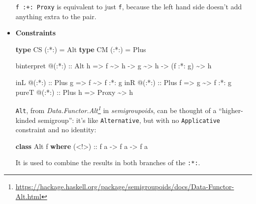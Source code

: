 \documentclass[]{article}
\newenvironment{Shaded}{}{}
\newcommand{\DataTypeTok}[1]{\textcolor[rgb]{0.56,0.13,0.00}{#1}}
\newcommand{\KeywordTok}[1]{\textcolor[rgb]{0.00,0.44,0.13}{\textbf{#1}}}
\newcommand{\NormalTok}[1]{#1}
\newcommand{\OperatorTok}[1]{\textcolor[rgb]{0.40,0.40,0.40}{#1}}
\newcommand{\OtherTok}[1]{\textcolor[rgb]{0.00,0.44,0.13}{#1}}
\renewcommand{\href}[2]{#2\footnote{\url{#1}}}
\begin{document}
\begin{itemize}
  \texttt{f\ :+:\ Proxy} is equivalent to just \texttt{f}, because the left hand
  side doesn't add anything extra to the pair.
\item
  \textbf{Constraints}

\begin{Shaded}
\begin{Highlighting}[]
\KeywordTok{type} \DataTypeTok{CS}\NormalTok{ (}\OperatorTok{:*:}\NormalTok{) }\OtherTok{=} \DataTypeTok{Alt}
\KeywordTok{type} \DataTypeTok{CM}\NormalTok{ (}\OperatorTok{:*:}\NormalTok{) }\OtherTok{=} \DataTypeTok{Plus}

\NormalTok{binterpret }\OperatorTok{@}\NormalTok{(}\OperatorTok{:*:}\NormalTok{)}
\OtherTok{    ::} \DataTypeTok{Alt}\NormalTok{ h}
    \OtherTok{=>}\NormalTok{ f }\OperatorTok{\textasciitilde{}>}\NormalTok{ h}
    \OtherTok{{-}>}\NormalTok{ g }\OperatorTok{\textasciitilde{}>}\NormalTok{ h}
    \OtherTok{{-}>}\NormalTok{ (f }\OperatorTok{:*:}\NormalTok{ g) }\OperatorTok{\textasciitilde{}>}\NormalTok{ h}

\NormalTok{inL   }\OperatorTok{@}\OtherTok{(:*:) ::} \DataTypeTok{Plus}\NormalTok{ g }\OtherTok{=>}\NormalTok{ f     }\OperatorTok{\textasciitilde{}>}\NormalTok{ f }\OperatorTok{:*:}\NormalTok{ g}
\NormalTok{inR   }\OperatorTok{@}\OtherTok{(:*:) ::} \DataTypeTok{Plus}\NormalTok{ f }\OtherTok{=>}\NormalTok{ g     }\OperatorTok{\textasciitilde{}>}\NormalTok{ f }\OperatorTok{:*:}\NormalTok{ g}
\NormalTok{pureT }\OperatorTok{@}\OtherTok{(:*:) ::} \DataTypeTok{Plus}\NormalTok{ h }\OtherTok{=>} \DataTypeTok{Proxy} \OperatorTok{\textasciitilde{}>}\NormalTok{ h}
\end{Highlighting}
\end{Shaded}

  \texttt{Alt}, from
  \emph{\href{https://hackage.haskell.org/package/semigroupoids/docs/Data-Functor-Alt.html}{Data.Functor.Alt}}
  in \emph{semigroupoids}, can be thought of a ``higher-kinded semigroup'': it's
  like \texttt{Alternative}, but with no \texttt{Applicative} constraint and no
  identity:

\begin{Shaded}
\begin{Highlighting}[]
\KeywordTok{class} \DataTypeTok{Alt}\NormalTok{ f }\KeywordTok{where}
\OtherTok{    (<!>) ::}\NormalTok{ f a }\OtherTok{{-}>}\NormalTok{ f a }\OtherTok{{-}>}\NormalTok{ f a}
\end{Highlighting}
\end{Shaded}

  It is used to combine the results in both branches of the \texttt{:*:}.


\end{itemize}
\end{document}
